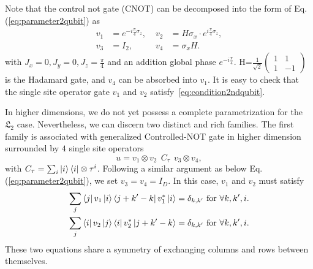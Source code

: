 \documentclass[aps,prx,twocolumn,notitlepage,nofootinbib,nobalancelastpage]{revtex4-2}
\theoremstyle{break}
\newcommand{\1}{\mathbbm{1}}
\theoremstyle{plain}
\theoremstyle{plain}
\theoremstyle{plain}
\begin{document}
Note that the control not gate ($\mathrm{CNOT}$) can be decomposed into the form of Eq. (\ref{eq:parameter2qubit}) as 
\begin{equation}
\begin{aligned}
v_1 & =e^{-i\frac{\pi}{4}\sigma_{z}},\; & v_2 & = H\sigma_{x}\cdot e^{i\frac{\pi}{4}\sigma_{z}},\\
v_3 & =I_2,\; & v_4 & =\sigma_{x}H.
\end{aligned}
\end{equation}
with $J_x=0,J_y=0,J_z=\frac{\pi}{4}$ and an addition global phase $e^{-i\frac{\pi}{4}}$.
H=$\frac{1}{\sqrt{2}}\begin{pmatrix}1 & 1\\
1 & -1
\end{pmatrix}$ is the Hadamard gate, 
and $v_{4}$ can be absorbed into $v_{1}$. It is easy to check that the single site operator gate $v_{1}$ and $v_{2}$ satisfy~\eqref{eq:condition2ndqubit}.




In higher dimensions, we do not yet possess a complete parametrization
for the $\mathfrak{L}_2$ case. Nevertheless, we can discern two
distinct and rich families. The first family is associated with generalized
Controlled-NOT gate in higher dimension surrounded by $4$ single site operators
\begin{equation}
u=v_1 \otimes v_2 \ \ C_{\tau} \ \ v_3 \otimes v_4,
\end{equation}
with 
$C_{\tau}=\sum_{i}\ket{i}\bra{i}\otimes \tau^{i}$.
Following a similar argument as below Eq. (\ref{eq:parameter2qubit}), we set $v_3=v_4=I_D$. In this case, $v_{1}$ and $v_{2}$
must satisfy
\begin{equation}
\begin{aligned}\sum_{j}\bra{j}v_{1}\ket{i}\bra{j+k'-k}v_{1}^{*}\ket{i} & =\delta_{k,k'}\ \mathrm{for}\ \forall k,k',i.\\
\sum_{j}\bra{i}v_{2}\ket{j}\bra{i}v_{2}^{*}\ket{j+k'-k} & =\delta_{k,k'}\ \mathrm{for}\ \forall k,k',i.
\end{aligned}
\end{equation}
These two equations share a symmetry of exchanging columns and rows between themselves. 
\end{document}

